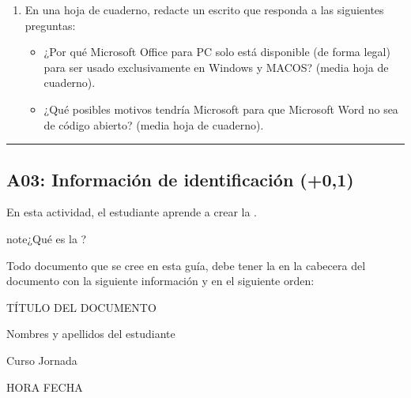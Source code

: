 \documentclass[letterpaper,10pt,spanish]{sphinxmanual}
\begin{document}
\begin{enumerate}
\item {} 
\sphinxAtStartPar
En una hoja de cuaderno, redacte un escrito que responda a las siguientes preguntas:
\begin{itemize}
\item {} 
\sphinxAtStartPar
¿Por qué Microsoft Office para PC solo está disponible (de forma legal) para ser usado exclusivamente en Windows y MACOS? (media hoja de cuaderno).

\item {} 
\sphinxAtStartPar
¿Qué posibles motivos tendría Microsoft para que Microsoft Word no sea de código abierto? (media hoja de cuaderno).

\end{itemize}

\end{enumerate}


\bigskip\hrule\bigskip



\subsection{A03: Información de identificación  (+0,1)}
\label{\detokenize{1_guias/10ofimatica/G1013:a03-informacion-de-identificacion-011-0-1}}
\sphinxAtStartPar
{}

\sphinxAtStartPar
En esta actividad, el estudiante aprende a crear la .

\begin{sphinxadmonition}{note}{¿Qué es la ?}

\sphinxAtStartPar
Todo documento que se cree en esta guía, debe tener la  en la cabecera del documento con la siguiente información y en el siguiente orden:

\begin{center}TÍTULO DEL DOCUMENTO
\end{center}
\begin{center}Nombres y apellidos del estudiante
\end{center}
\begin{center}Curso \sphinxhyphen{} Jornada
\end{center}
\begin{center}HORA \sphinxhyphen{} FECHA
\end{center}\end{sphinxadmonition}
\end{document}
